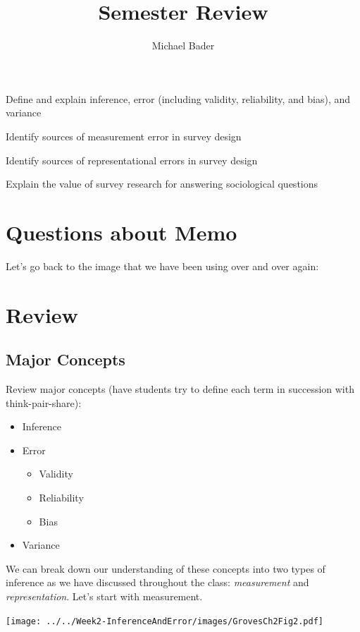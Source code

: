 \documentclass[11pt]{lecturenotes}
\title{Semester Review}
\author{Michael Bader}
\begin{document}
\maketitle

\begin{objectives}{
\item Define and explain inference, error (including validity, reliability, and bias), and variance
\item Identify sources of measurement error in survey design
\item Identify sources of representational errors in survey design
\item Explain the value of survey research for answering sociological questions
}{
\objExplainPrinciples
}
\end{objectives}

\section[15]{Questions about Memo}
Let's go back to the image that we have been using over and over again: 

\section{Review}
\subsection[20]{Major Concepts}
Review major concepts (have students try to define each term in succession with think-pair-share): 

\begin{itemize}
\item Inference
\item Error
	\begin{itemize}
	\item Validity
	\item Reliability
	\item Bias
	\end{itemize}
\item Variance
\end{itemize}

We can break down our understanding of these concepts into two types of inference as we have discussed throughout the class: \emph{measurement} and \emph{representation}. Let's start with measurement.

\begin{center}
\texttt{[image: ../../Week2-InferenceAndError/images/GrovesCh2Fig2.pdf]}
\end{center}
\end{document}
